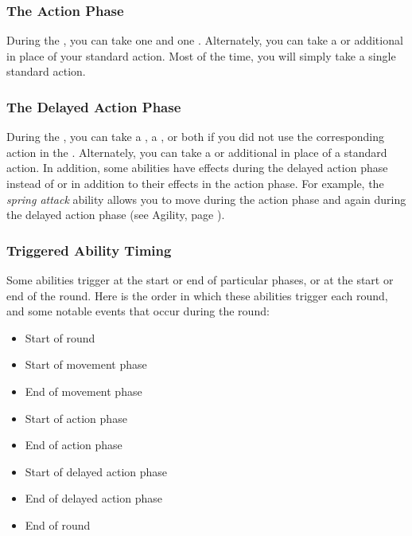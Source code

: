         \subsubsection{The Action Phase}\label{The Action Phase}
            During the , you can take one  and one .
            Alternately, you can take a  or additional  in place of your standard action.
            Most of the time, you will simply take a single standard action.

        \subsubsection{The Delayed Action Phase}\label{The Delayed Action Phase}
            During the , you can take a , a , or both if you did not use the corresponding action in the .
            Alternately, you can take a  or additional  in place of a standard action.
            In addition, some abilities have effects during the delayed action phase instead of or in addition to their effects in the action phase.
            For example, the \textit{spring attack} ability allows you to move during the action phase and again during the delayed action phase (see Agility, page ).

        \subsubsection{Triggered Ability Timing}\label{Triggered Ability Timing}
            Some abilities trigger at the start or end of particular phases, or at the start or end of the round.
            Here is the order in which these abilities trigger each round, and some notable events that occur during the round:
            \begin{itemize}
                \item Start of round
                \item Start of movement phase
                \item End of movement phase
                \item Start of action phase
                \item End of action phase
                \item Start of delayed action phase
                \item End of delayed action phase
                \item End of round
            \end{itemize}

